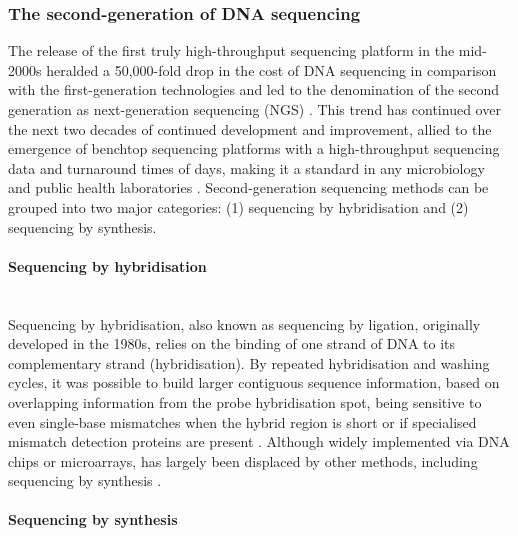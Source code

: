 \subsubsection{The second-generation of DNA sequencing} \label{ssec:_intro_2nd_gen_seq}

The release of the first truly high-throughput sequencing platform in the mid-2000s heralded a 50,000-fold drop in the cost of DNA sequencing in comparison with the first-generation technologies and led to the denomination of the second generation as next-generation sequencing (NGS) \citep{goodwin_coming_2016}. 
This trend has continued over the next two decades of continued development and improvement, allied to the emergence of benchtop sequencing platforms with a high-throughput sequencing data and turnaround times of days, making it a standard in any microbiology and public health laboratories \citep{loman_twenty_2015}. 
Second-generation sequencing methods can be grouped into two major categories: (1) sequencing by hybridisation and (2) sequencing by synthesis. 

\paragraph{Sequencing by hybridisation} \label{sssec:_intro_2nd_gen_seq_hybrid} \mbox{}\\

Sequencing by hybridisation, also known as sequencing by ligation, originally developed in the 1980s, relies on the binding of one strand of DNA to its complementary strand (hybridisation). 
By repeated hybridisation and washing cycles, it was possible to build larger contiguous sequence information, based on overlapping information from the probe hybridisation spot, being sensitive to even single-base mismatches when the hybrid region is short or if specialised mismatch detection proteins are present \citep{slatko_overview_2018, detter_nucleic_2014}. 
Although widely implemented via DNA chips or microarrays, has largely been displaced by other methods, including sequencing by synthesis \citep{goodwin_coming_2016}. 

\paragraph{Sequencing by synthesis} \label{sssec:_intro_2nd_gen_seq_synth} \mbox{}\\

